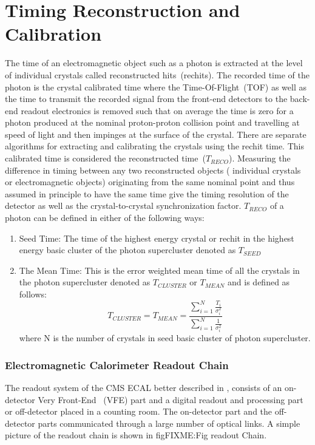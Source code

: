 \chapter{Timing Reconstruction and Calibration}
The time of an electromagnetic object such as a photon is extracted at the level of individual crystals called reconstructed hits~(rechits). The recorded time of the photon is the crystal calibrated time where the Time-Of-Flight~(TOF) as well as the time to transmit the recorded signal from the front-end detectors to the back-end readout electronics is removed such that on average the time is zero for a photon produced at the nominal proton-proton collision point and travelling at speed of light and then impinges at the surface of the crystal.  There are separate algorithms for extracting and calibrating the crystals using the rechit time. This calibrated time is considered the reconstructed time~($T_{RECO}$). 
Measuring the difference in timing between any two reconstructed objects ( individual crystals or electromagnetic objects) originating from the same nominal point and thus assumed in principle to have the same time give the timing resolution of the detector as well as the crystal-to-crystal synchronization factor.  $T_{RECO}$ of a photon can be defined in either of the following ways:
\begin{enumerate}
\item Seed Time: The time of the highest energy crystal or rechit in the highest energy basic cluster of the photon supercluster denoted as $T_{SEED}$
\item The Mean Time: This is the error weighted mean time of all the crystals in the photon supercluster denoted as $T_{CLUSTER}$ or $T_{MEAN}$ and is defined as follows:
\begin{equation}
T_{CLUSTER} = T_{MEAN} = \frac{\sum_{i=1}^N\frac{T_{i}}{\sigma_{i}^{2}}}{\sum_{i=1}^{N}\frac{1}{\sigma_{i}^{2}}} 
\end{equation}
\newline
 where N is the number of crystals in seed basic cluster of photon supercluster. 

\end{enumerate}
\subsection{Electromagnetic Calorimeter Readout Chain}
The readout system of the CMS ECAL better described in \cite{ECALREADOUT}, consists of an on-detector Very Front-End ~(VFE) part and a digital readout and processing part or off-detector placed in a counting room. The on-detector part and the off-detector parts communicated through a large number of optical links. A simple picture of the readout chain is shown in fig{FIXME:Fig readout Chain}.

